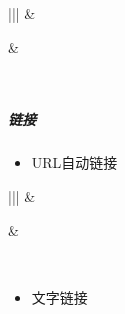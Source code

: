 \documentclass[a4paper,10pt,english]{sphinxmanual}
\begin{document}
\begin{savenotes}\sphinxattablestart
\centering
\begin{tabular}[t]{|||}
\hline
{}\relax &\relax \\
\hline\begin{sphinxfigure-in-table}
\centering

\noindent{}
\end{sphinxfigure-in-table}\relax
&\begin{sphinxfigure-in-table}
\centering

\noindent{}
\end{sphinxfigure-in-table}\relax
\\
\hline
\end{tabular}
\par
\sphinxattableend\end{savenotes}


\subparagraph{链接}
\label{\detokenize{sphinx/1-generate/4-edit:id11}}\begin{itemize}
\item {} 
URL自动链接

\end{itemize}


\begin{savenotes}\sphinxattablestart
\centering
\begin{tabular}[t]{|||}
\hline
{}\relax &\relax \\
\hline\begin{sphinxfigure-in-table}
\centering

\noindent{}
\end{sphinxfigure-in-table}\relax
&\begin{sphinxfigure-in-table}
\centering

\noindent{}
\end{sphinxfigure-in-table}\relax
\\
\hline
\end{tabular}
\par
\sphinxattableend\end{savenotes}
\begin{itemize}
\item {} 
文字链接

\end{itemize}
\end{document}
